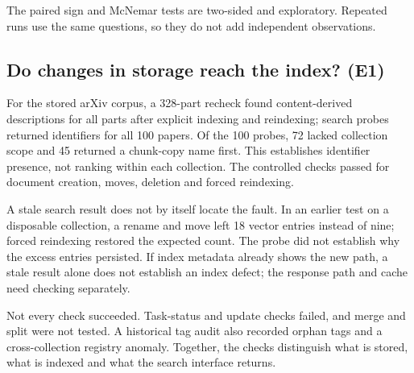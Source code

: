 The paired sign and McNemar tests are two-sided and exploratory. Repeated
runs use the same questions, so they do not add independent observations.

\subsection{Do changes in storage reach the index? (E1)}
\label{sec:e1}
\label{sec:e2}
\label{sec:exp-e1}
For the stored arXiv corpus, a 328-part recheck found content-derived
descriptions for all parts after explicit indexing and reindexing; search
probes returned identifiers for all 100 papers. Of the 100
probes, 72 lacked collection scope and 45 returned a chunk-copy name first.
This establishes identifier presence, not ranking within each collection. The controlled
checks passed for document creation, moves, deletion and forced reindexing.

A stale search result does not by itself locate the fault. In an earlier
test on a disposable collection, a rename and move left 18 vector
entries instead of nine; forced reindexing restored the expected count. The probe did not establish
why the excess entries persisted. If index metadata already shows the new path, a stale
result alone does not establish an index defect; the response path and
cache need checking separately.

Not every check succeeded. Task-status and update checks failed, and merge
and split were not tested. A historical tag audit also recorded orphan tags
and a cross-collection registry anomaly. Together, the checks distinguish
what is stored, what is indexed and what the search interface returns.
